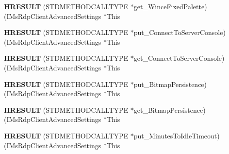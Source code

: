 \begin{DoxyCompactItemize}
\mbox{\label{struct_i_ms_rdp_client_advanced_settings_vtbl_ae99e6cd8281e7efdd3265b93c07b10e1}} 
{\bfseries H\+R\+E\+S\+U\+LT} (S\+T\+D\+M\+E\+T\+H\+O\+D\+C\+A\+L\+L\+T\+Y\+PE $\ast$get\+\_\+\+Wince\+Fixed\+Palette)(I\+Ms\+Rdp\+Client\+Advanced\+Settings $\ast$This
\item 
\mbox{\label{struct_i_ms_rdp_client_advanced_settings_vtbl_a4ec14a9048329d22d5055020f5784523}} 
{\bfseries H\+R\+E\+S\+U\+LT} (S\+T\+D\+M\+E\+T\+H\+O\+D\+C\+A\+L\+L\+T\+Y\+PE $\ast$put\+\_\+\+Connect\+To\+Server\+Console)(I\+Ms\+Rdp\+Client\+Advanced\+Settings $\ast$This
\item 
\mbox{\label{struct_i_ms_rdp_client_advanced_settings_vtbl_ad968807702234a57b23e336ea5cac00f}} 
{\bfseries H\+R\+E\+S\+U\+LT} (S\+T\+D\+M\+E\+T\+H\+O\+D\+C\+A\+L\+L\+T\+Y\+PE $\ast$get\+\_\+\+Connect\+To\+Server\+Console)(I\+Ms\+Rdp\+Client\+Advanced\+Settings $\ast$This
\item 
\mbox{\label{struct_i_ms_rdp_client_advanced_settings_vtbl_a077a8ad39c1989f533a3c8b22f152eaa}} 
{\bfseries H\+R\+E\+S\+U\+LT} (S\+T\+D\+M\+E\+T\+H\+O\+D\+C\+A\+L\+L\+T\+Y\+PE $\ast$put\+\_\+\+Bitmap\+Persistence)(I\+Ms\+Rdp\+Client\+Advanced\+Settings $\ast$This
\item 
\mbox{\label{struct_i_ms_rdp_client_advanced_settings_vtbl_aea372dc95cc352ab63c7e63cc5b76571}} 
{\bfseries H\+R\+E\+S\+U\+LT} (S\+T\+D\+M\+E\+T\+H\+O\+D\+C\+A\+L\+L\+T\+Y\+PE $\ast$get\+\_\+\+Bitmap\+Persistence)(I\+Ms\+Rdp\+Client\+Advanced\+Settings $\ast$This
\item 
\mbox{\label{struct_i_ms_rdp_client_advanced_settings_vtbl_a19a06b174620c091519634ae5ebc4ab1}} 
{\bfseries H\+R\+E\+S\+U\+LT} (S\+T\+D\+M\+E\+T\+H\+O\+D\+C\+A\+L\+L\+T\+Y\+PE $\ast$put\+\_\+\+Minutes\+To\+Idle\+Timeout)(I\+Ms\+Rdp\+Client\+Advanced\+Settings $\ast$This
\item 
\mbox{\label{struct_i_ms_rdp_client_advanced_settings_vtbl_a6a790aa89808aa61f532d3a501ad8d2a}} 

\end{DoxyCompactItemize}
